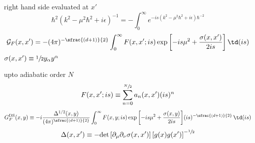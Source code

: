 right hand side evaluated at $x'$
\begin{equation}
	\hbar^2(k^2-\mu^2\hbar^2+i\epsilon)^{-1}=-\int_0^\infty e^{-is(k^2-\mu^2\hbar^2+i\epsilon)\hbar^{-2}}
\end{equation}
\begin{equation}
	\mathcal{G}_F(x,x')=-(4\pi)^{-\sfrac{(d+1)}{2}}\int_0^\infty F(x,x';is)\exp{\left[-is\mu^2+\frac{\sigma(x,x')}{2is}\right]}\,\td(is)
\end{equation}
$\sigma(x,x')\equiv\sfrac{1}{2}y_\alpha y^\alpha$

upto adiabatic order $N$
\begin{equation}
	F(x,x';is)\equiv \sum_{n=0}^{\sfrac{N}{2}}a_n(x,x')(is)^n
\end{equation}
\begin{equation}
	G_F^{\text{DS}}(x,y)\equiv -i\frac{\Delta^{1/2}(x,y)}{(4\pi)^{\sfrac{(d+1)}{2}}}\int^\infty_0F(x,y;is)\exp{\left[-is\mu^2+\frac{\sigma(x,y)}{2is}\right]}(is)^{-\sfrac{(d+1)}{2}}\,\td (is)
\end{equation}
\begin{equation}
	\Delta(x,x')\equiv -\text{det}\left[\partial_\mu\partial_\nu\sigma(x,x')\right]\left[g(x)g(x')\right]^{-\sfrac{1}{2}}
\end{equation}